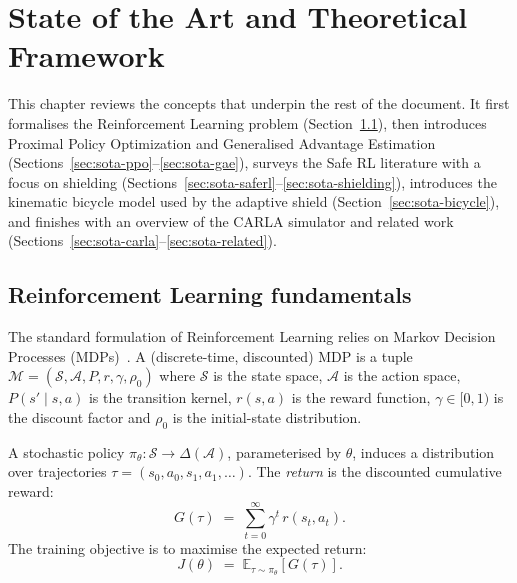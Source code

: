 
\chapter{State of the Art and Theoretical Framework}\label{ch:sota}

This chapter reviews the concepts that underpin the rest of the document. It first formalises the
Reinforcement Learning problem (Section~\ref{sec:sota-rl}), then introduces Proximal Policy
Optimization and Generalised Advantage Estimation
(Sections~\ref{sec:sota-ppo}--\ref{sec:sota-gae}), surveys the Safe RL literature with a focus on
shielding (Sections~\ref{sec:sota-saferl}--\ref{sec:sota-shielding}), introduces the kinematic
bicycle model used by the adaptive shield (Section~\ref{sec:sota-bicycle}), and finishes with an
overview of the CARLA simulator and related work
(Sections~\ref{sec:sota-carla}--\ref{sec:sota-related}).

\section{Reinforcement Learning fundamentals}\label{sec:sota-rl}

The standard formulation of Reinforcement Learning relies on Markov Decision Processes
(MDPs)~\cite{sutton2018rl,puterman1994mdp}. A (discrete-time, discounted) MDP is a tuple
\(\mathcal{M} = (\mathcal{S}, \mathcal{A}, P, r, \gamma, \rho_0)\) where \(\mathcal{S}\) is the
state space, \(\mathcal{A}\) is the action space, \(P(s'\mid s,a)\) is the transition kernel,
\(r(s,a)\) is the reward function, \(\gamma \in [0,1)\) is the discount factor and \(\rho_0\)
is the initial-state distribution.

A stochastic policy \(\pi_\theta: \mathcal{S}\to\Delta(\mathcal{A})\), parameterised by
\(\theta\), induces a distribution over trajectories \(\tau = (s_0, a_0, s_1, a_1, \ldots)\).
The \emph{return} is the discounted cumulative reward:
\begin{equation}
  G(\tau) \;=\; \sum_{t=0}^{\infty} \gamma^t\, r(s_t, a_t).
  \label{eq:return}
\end{equation}
The training objective is to maximise the expected return:
\begin{equation}
  J(\theta) \;=\; \mathbb{E}_{\tau \sim \pi_\theta}\!\left[ G(\tau) \right].
  \label{eq:objective}
\end{equation}

